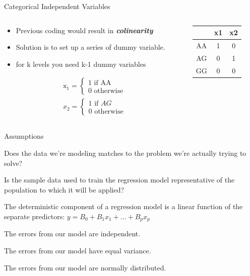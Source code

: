 \documentclass[australian,ignorenonframetext,aspectratio=169]{beamer}
\providecommand{\tightlist}{%
  \setlength{\itemsep}{0pt}\setlength{\parskip}{0pt}}
\begin{document}
\begin{frame}{Categorical Independent Variables}
\protect\hypertarget{categorical-independent-variables-1}{}

\begin{columns}[T]
\begin{column}{0.5\textwidth}
\begin{itemize}
\item
  Previous coding would result in \textbf{\emph{colinearity}}
\item
  Solution is to set up a series of dummy variable.
\item
  for k levels you need k-1 dummy variables
\end{itemize}

\[
\begin{aligned}
& \mathrm{x}_{1}=\left\{\begin{array}{l}1 \text { if } \mathrm{AA} \\0 \text { otherwise }\end{array}\right. \\
& x_{2}=\left\{\begin{array}{l}1 \text { if } A G \\0 \text { otherwise }\end{array}\right.
\end{aligned}
\]
\end{column}

\begin{column}{0.5\textwidth}
\begin{longtable}[]{@{}ccc@{}}
\toprule
& x1 & x2\tabularnewline
\midrule
\endhead
AA & 1 & 0\tabularnewline
AG & 0 & 1\tabularnewline
GG & 0 & 0\tabularnewline
\bottomrule
\end{longtable}
\end{column}
\end{columns}

\end{frame}

\begin{frame}{Assumptions}
\protect\hypertarget{assumptions}{}

\begin{description}
\tightlist
\item[Validity]
Does the data we're modeling matches to the problem we're actually
trying to solve?
\item[Representativeness]
Is the sample data used to train the regression model representative of
the population to which it will be applied?
\item[Additivity and Linearity]
The deterministic component of a regression model is a linear function
of the separate predictors: \(y=B_0 + B_1x_1 + ... + B_px_p\)
\item[Independence of Errors]
The errors from our model are independent.
\item[Homoscedasticity]
The errors from our model have equal variance.
\item[Normality of Errors]
The errors from our model are normally distributed.
\end{description}

\end{frame}
\end{document}
